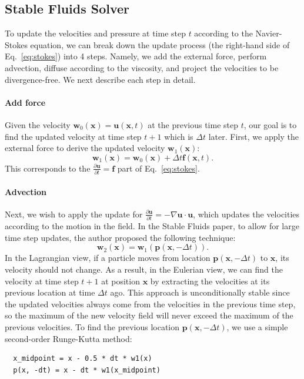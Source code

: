 \documentclass[sigconf]{acmart}
\begin{document}
\subsection{Stable Fluids Solver}
To update the velocities and pressure at time step $t$ according to the Navier-Stokes equation, we can break down the update process (the right-hand side of Eq.~\ref{eq:stokes}) into 4 steps. Namely, we add the external force, perform advection, diffuse according to the viscosity, and project the velocities to be divergence-free. We next describe each step in detail.

\paragraph{Add force} Given the velocity $\mathbf{w}_0(\mathbf{x}) = \mathbf{u}(\mathbf{x}, t)$ at the previous time step $t$, our goal is to find the updated velocity at time step $t + 1$ which is $\Delta t$ later. First, we apply the external force to derive the updated velocity $\mathbf{w}_1(\mathbf{x})$:
\begin{equation}
  \mathbf{w}_1(\mathbf{x}) = \mathbf{w}_0(\mathbf{x}) + \Delta t \mathbf{f}(\mathbf{x}, t).
\end{equation}
This corresponds to the $\frac{\partial \mathbf{u}}{\partial t} = \mathbf{f}$ part of Eq.~\ref{eq:stokes}.

\paragraph{Advection} Next, we wish to apply the update for $\frac{\partial \mathbf{u}}{\partial t} = -\nabla\mathbf{u} \cdot \mathbf{u}$, which updates the velocities according to the motion in the field. In the Stable Fluids paper, to allow for large time step updates, the author proposed the following technique:
\begin{equation}
  \mathbf{w}_2(\mathbf{x}) = \mathbf{w}_1(\mathbf{p}(\mathbf{x}, -\Delta t)).
\end{equation}
In the Lagrangian view, if a particle moves from location $\mathbf{p}(\mathbf{x}, -\Delta t)$ to $\mathbf{x}$, its velocity should not change. As a result, in the Eulerian view, we can find the velocity at time step $t+1$ at position $\mathbf{x}$ by extracting the velocities at its previous location at time $\Delta t$ ago. This approach is unconditionally stable since the updated velocities always come from the velocities in the previous time step, so the maximum of the new velocity field will never exceed the maximum of the previous velocities. To find the previous location $\mathbf{p}(\mathbf{x}, -\Delta t)$, we use a simple second-order Runge-Kutta method:
\begin{verbatim}
  x_midpoint = x - 0.5 * dt * w1(x)
  p(x, -dt) = x - dt * w1(x_midpoint)
\end{verbatim}
\end{document}
